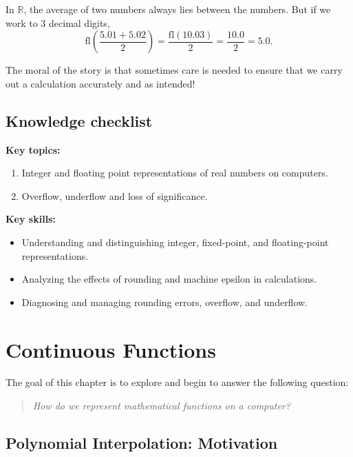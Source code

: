 \documentclass[
  letterpaper,
  DIV=11,
  numbers=noendperiod]{scrreprt}
\begin{document}
In \(\mathbb{R}\), the average of two numbers always lies between the
numbers. But if we work to 3 decimal digits, \[
\mathrm{fl}\left(\frac{5.01 + 5.02}{2}\right) = \frac{\mathrm{fl}(10.03)}{2} = \frac{10.0}{2} = 5.0.
\]

The moral of the story is that sometimes care is needed to ensure that
we carry out a calculation accurately and as intended!

\section*{Knowledge checklist}\label{knowledge-checklist}


\textbf{Key topics:}

\begin{enumerate}
\def\labelenumi{\arabic{enumi}.}
\item
  Integer and floating point representations of real numbers on
  computers.
\item
  Overflow, underflow and loss of significance.
\end{enumerate}

\textbf{Key skills:}

\begin{itemize}
\item
  Understanding and distinguishing integer, fixed-point, and
  floating-point representations.
\item
  Analyzing the effects of rounding and machine epsilon in calculations.
\item
  Diagnosing and managing rounding errors, overflow, and underflow.
\end{itemize}


\chapter{Continuous Functions}\label{continuous-functions}

The goal of this chapter is to explore and begin to answer the following
question:

\begin{quote}
\emph{How do we represent mathematical functions on a computer?}
\end{quote}

\section*{Polynomial Interpolation:
Motivation}\label{polynomial-interpolation-motivation}
\end{document}
